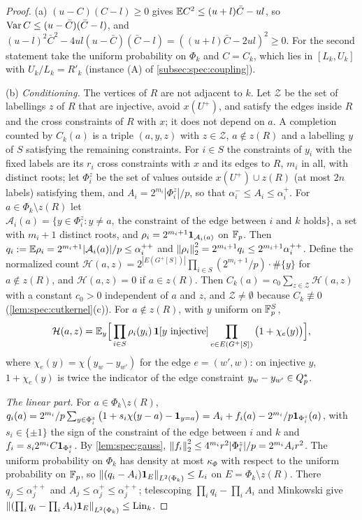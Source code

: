 \begin{proof}
(a) $(u-C)(C-l)\ge0$ gives $\mathbb E C^2\le(u+l)\bar C-ul$, so
$\operatorname{Var} C\le(u-\bar C)(\bar C-l)$, and
$(u-l)^2\bar C^2-4ul(u-\bar C)(\bar C-l)=((u+l)\bar C-2ul)^2\ge0$. For the second statement take
the uniform probability on $\Phi_k$ and $C=C_k$, which lies in $[L_k,U_k]$ with
$U_k/L_k=R'_k$ (instance (A) of \cref{subsec:spec:coupling}).

(b) \emph{Conditioning.} The vertices of $R$ are not adjacent to $k$. Let $\mathcal Z$ be
the set of labellings $z$ of $R$ that are injective, avoid $x(U^+)$, and satisfy the
edges inside $R$ and the cross constraints of $R$ with $x$; it does not depend on
$a$. A completion counted by $C_k(a)$ is a triple $(a,y,z)$ with $z\in\mathcal Z$,
$a\notin z(R)$ and a labelling $y$ of $S$ satisfying the remaining constraints. For
$i\in S$ the constraints of $y_i$ with the fixed labels are its $r_i$ cross
constraints with $x$ and its edges to $R$, $m_i$ in all, with distinct roots; let
$\Phi^z_i$ be the set of values outside $x(U^+)\cup z(R)$ (at most $2n$ labels)
satisfying them, and $A_i=2^{m_i}|\Phi^z_i|/p$, so that $\alpha^-_i\le A_i\le\alpha^+_i$. For
$a\in\Phi_k\setminus z(R)$ let $\mathcal A_i(a)=\{y\in\Phi^z_i:y\ne a,\ \text{the constraint of
the edge between $i$ and $k$ holds}\}$, a set with $m_i+1$ distinct roots, and
$\rho_i=2^{m_i+1}\mathbf 1_{\mathcal A_i(a)}$ on $\mathbb F_p$. Then
$q_i:=\mathbb E\rho_i=2^{m_i+1}|\mathcal A_i(a)|/p\le\alpha^{++}_i$ and
$\left\|\rho_i\right\|^2_2=2^{m_i+1}q_i\le2^{m_i+1}\alpha^{++}_i$. Define the normalized count
$\mathcal H(a,z)=2^{|E(G^+[S])|}\prod_{i\in S}(2^{m_i+1}/p)\cdot\#\{y\}$ for $a\notin z(R)$,
and $\mathcal H(a,z)=0$ if $a\in z(R)$. Then
$C_k(a)=c_0\sum_{z\in\mathcal Z}\mathcal H(a,z)$ with a constant $c_0>0$ independent of $a$ and
$z$, and $\mathcal Z\ne\emptyset$ because $C_k\not\equiv0$ (\cref{lem:spec:cutkernel}(c)).
For $a\notin z(R)$, with $y$ uniform on $\mathbb F_p^S$,
\[
  \mathcal H(a,z)=\mathbb E_y\Big[\prod_{i\in S}\rho_i(y_i)\,\mathbf 1[y\ \text{injective}]
  \prod_{e\in E(G^+[S])}\big(1+\chi_e(y)\big)\Big],
\]
where $\chi_e(y)=\chi(y_w-y_{w'})$ for the edge $e=(w',w)$: on injective $y$,
$1+\chi_e(y)$ is twice the indicator of the edge constraint $y_w-y_{w'}\in Q_{p}^{*}$.

\emph{The linear part.} For $a\in\Phi_k\setminus z(R)$,
$q_i(a)=2^{m_i}/p\sum_{y\in\Phi^z_i}\big(1+s_i\chi(y-a)-\mathbf 1_{y=a}\big)
=A_i+f_i(a)-2^{m_i}/p\mathbf 1_{\Phi^z_i}(a)$, with $s_i\in\{\pm1\}$ the sign of the
constraint of the edge between $i$ and $k$ and $f_i=s_i2^{m_i}C\mathbf 1_{\Phi^z_i}$. By
\cref{lem:spec:gauss}, $\left\|f_i\right\|^2_2\le4^{m_i}r^2|\Phi^z_i|/p=2^{m_i}A_ir^2$. The
uniform probability on $\Phi_k$ has density at most $\kappa_\Phi$ with respect to the
uniform probability on $\mathbb F_p$, so $\left\|(q_i-A_i)\mathbf 1_E\right\|_{L^2(\Phi_k)}\le L_i$ on
$E=\Phi_k\setminus z(R)$. There $q_j\le\alpha^{++}_j$ and $A_j\le\alpha^+_j\le\alpha^{++}_j$;
telescoping $\prod_iq_i-\prod_iA_i$ and Minkowski give
$\left\|(\prod_iq_i-\prod_iA_i)\mathbf 1_E\right\|_{L^2(\Phi_k)}\le\mathrm{Lin}_k$.


\end{proof}
